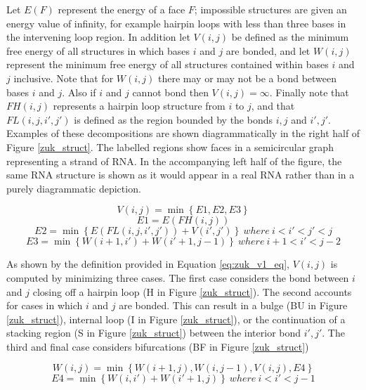 \documentclass{cshonours}
\begin{document}
Let $E(F)$ represent the energy of a face $F$; impossible structures are given
an energy value of infinity, for example hairpin loops with less than three bases in the
intervening loop region. In addition let $V(i, j)$ be defined as the minimum free
energy of all structures in which bases $i$ and $j$ are bonded, and let $W(i, j)$ represent
the minimum free energy of all structures contained within bases $i$ and $j$ inclusive.
Note that for $W(i, j)$ there may or may not be a bond between bases $i$ and $j$. Also
if $i$ and $j$ cannot bond then $V(i, j) = \infty $. Finally note that $FH(i, j)$ represents a
hairpin loop structure from $i$ to $j$, and that $FL(i, j, i' , j' )$ is defined as the region
bounded by the bonds $i, j$ and $i', j'$. Examples of these decompositions are shown
diagrammatically in the right half of Figure \ref{zuk_struct}. The labelled regions show faces
in a semicircular graph representing a strand of RNA. In the accompanying left
half of the figure, the same RNA structure is shown as it would appear in a real
RNA rather than in a purely diagrammatic depiction.

\begin{equation} \label{eq:zuk_v1_eq}
V(i, j) = \min \left\lbrace E1, E2, E3 \right\rbrace
\end{equation}
$$E1 = E(FH(i, j))$$
$$E2 = \min \left\lbrace E(FL(i, j, i', j')) + V (i', j') \right\rbrace \: where \: i < i' < j' < j$$
$$E3 = \min \left\lbrace W (i + 1, i') + W (i' + 1, j − 1) \right\rbrace \: where \: i + 1 < i' < j - 2$$


As shown by the definition provided in Equation \ref{eq:zuk_v1_eq}, $V (i, j)$ is computed by minimizing
three cases. The first case considers the bond between $i$ and $j$ closing off a hairpin
loop (H in Figure \ref{zuk_struct}). The second accounts for cases in which $i$ and $j$ are bonded. This can result in a bulge (BU in Figure \ref{zuk_struct}), internal loop (I in Figure \ref{zuk_struct}), or the continuation of a stacking region (S in Figure \ref{zuk_struct}) between the
interior bond $i',j'$. The third and final case considers bifurcations
(BF in Figure \ref{zuk_struct})

\begin{equation} \label{eq:zuk_v1_eq2}
W (i, j) = \min \left\lbrace W(i + 1, j), W(i, j − 1), V(i, j), E4 \right\rbrace
\end{equation}
$$
E4 = \min \left\lbrace W (i, i') + W (i' + 1, j) \right\rbrace \: where \: i < i' < j - 1
$$
\end{document}
